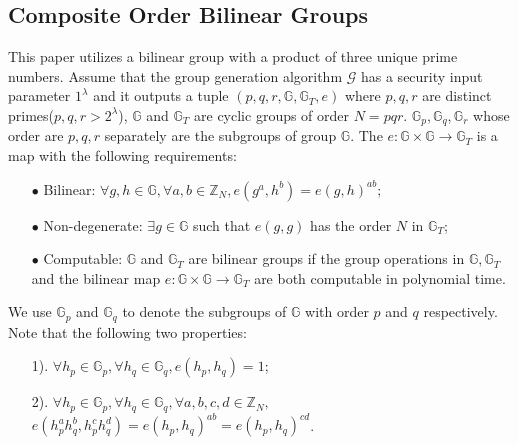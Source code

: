 \documentclass[smallextended]{svjour3}       %
\begin{document}
\subsection{Composite Order Bilinear Groups}
	This paper utilizes a bilinear group with a product of three unique prime numbers. 
	Assume that the group generation algorithm $\mathcal{G}$ has a security input parameter $1^{\lambda}$ and it outputs a tuple $(p,q,r,\mathbb{G},\mathbb{G}_{T},e)$ where $p,q,r$ are distinct primes($p,q,r>2^{\lambda}$), $\mathbb{G}$ and $\mathbb{G}_{T}$ are cyclic groups of order 
	$N=pqr$. $\mathbb{G}_{p},\mathbb{G}_{q},\mathbb{G}_{r}$ 
	whose order are ${p,q,r}$ separately are the subgroups of group $\mathbb{G}$. 
	The $e:\mathbb{G}\times\mathbb{G}\to\mathbb{G}_{T}$ is a map with the following requirements:
\begin{itemize}
	\item[$\bullet$] Bilinear: $\forall g,h \in \mathbb{G}, \forall a,b \in \mathbb{Z}_{N},e(g^a,h^b)=e(g,h)^{ab};$
	\item[$\bullet$] Non-degenerate: $\exists g \in \mathbb{G}$ such that $e(g,g)$ has the order $N$ in $\mathbb{G}_{T}$;
	\item[$\bullet$] Computable: $\mathbb{G}$ and $\mathbb{G}_{T}$ are bilinear groups if the group operations in  $\mathbb{G},\mathbb{G}_{T}$ and the bilinear map $e:\mathbb{G}\times\mathbb{G}\to\mathbb{G}_{T}$ are both computable in polynomial time.
\end{itemize}
	We use $\mathbb{G}_p$ and $\mathbb{G}_q$ to denote the subgroups of $\mathbb{G}$ with order $p$ and $q$ respectively. Note that the following two properties:
\begin{itemize}
	\item [1).] $\forall h_p \in \mathbb{G}_p, \forall h_q \in \mathbb{G}_q, e(h_p,h_q)=1$;
	\item [2).] $\forall h_p \in \mathbb{G}_p, \forall h_q \in \mathbb{G}_q, \forall a,b,c,d \in \mathbb{Z}_N,$\\ $e(h_{p}^{a}h_{q}^{b},h_{p}^{c}h_{q}^{d})=e(h_p,h_q)^{ab}=e(h_p,h_q)^{cd}$.
\end{itemize}
\end{document}
